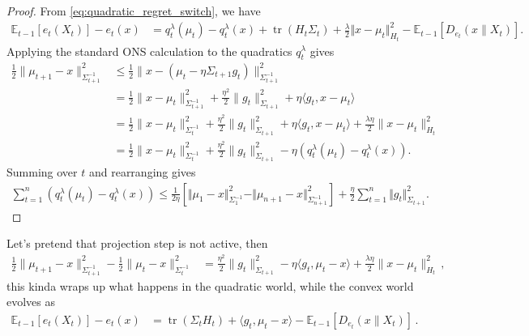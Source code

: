 \documentclass{article}
\theoremstyle{plain}
\theoremstyle{definition}
\theoremstyle{plain}
\newcommand{\tr}{\operatorname{tr}}
\newcommand{\norm}[1]{\Vert #1 \Vert}
\newcommand{\E}{\mathbb E}
\begin{document}
\begin{proof}
    From \cref{eq:quadratic_regret_switch}, we have
    \begin{align}
        \E_{t-1}[e_t(X_t)]-e_t(x)
         & =
        q_t^\lambda(\mu_t)-q_t^\lambda(x)
        +\tr(H_t\Sigma_t)
        +\frac{\lambda}{2}\norm{x-\mu_t}_{H_t}^2
        - \E_{t-1}[D_{e_t}(x\|X_t)].
    \end{align}
    Applying the standard ONS calculation to the quadratics $q_t^\lambda$ gives
    \begin{align}
        \frac12 \|\mu_{t+1}-x\|_{\Sigma_{t+1}^{-1}}^2
         & \leq
        \frac12 \|x - (\mu_t - \eta \Sigma_{t+1} g_t)\|_{\Sigma_{t+1}^{-1}}^2
        \\
         & =
        \frac12 \|x - \mu_t\|_{\Sigma_{t+1}^{-1}}^2
        + \frac{\eta^2}{2}\|g_t\|_{\Sigma_{t+1}}^2
        + \eta \langle g_t, x - \mu_t\rangle
        \\
         & =
        \frac12 \|x - \mu_t\|_{\Sigma_{t}^{-1}}^2
        + \frac{\eta^2}{2}\|g_t\|_{\Sigma_{t+1}}^2
        + \eta \langle g_t, x - \mu_t\rangle
        + \frac{\lambda \eta}{2}\|x - \mu_t\|_{H_t}^2
        \\
         & =
        \frac12 \|x - \mu_t\|_{\Sigma_{t}^{-1}}^2
        + \frac{\eta^2}{2}\|g_t\|_{\Sigma_{t+1}}^2
        - \eta \left(q_t^\lambda(\mu_t)-q_t^\lambda(x)\right) .\label{eq:alternative-form}
    \end{align}
    Summing over $t$ and rearranging gives
    \begin{align}
        \sum_{t=1}^n\left(q_t^\lambda(\mu_t)-q_t^\lambda(x)\right)
        \leq
        \frac{1}{2\eta}
        \left[
        \norm{\mu_1-x}_{\Sigma_1^{-1}}^2
        - \norm{\mu_{n+1}-x}_{\Sigma_{n+1}^{-1}}^2
        \right]
        +\frac{\eta}{2}\sum_{t=1}^n\norm{g_t}_{\Sigma_{t+1}}^2 .
        \label{eq:hermite-ons:qreg}
    \end{align}
\end{proof}
Let's pretend that projection step is not active, then
\begin{align}
    \frac{1}{2}\| \mu_{t+1}-x\|_{\Sigma_{t+1}^{-1}}^2
    - \frac{1}{2} \| \mu_t-x\|_{\Sigma_{t}^{-1}}^2
     & =
    \frac{\eta^2}{2} \|g_t\|_{\Sigma_{t+1}}^2
    - \eta \langle g_t, \mu_t-x\rangle
    + \frac{\lambda \eta}{2} \|x-\mu_t\|_{H_t}^2\,,
\end{align}
this kinda wraps up what happens in the quadratic world, while the convex world evolves as
\begin{align}
    \E_{t-1}[e_t(X_t)] - e_t(x)
     & =
    \tr(\Sigma_t H_t)
    + \langle g_t, \mu_t-x\rangle
    - \E_{t-1}[D_{e_t}(x\|X_t)]\,.
\end{align}
\end{document}
